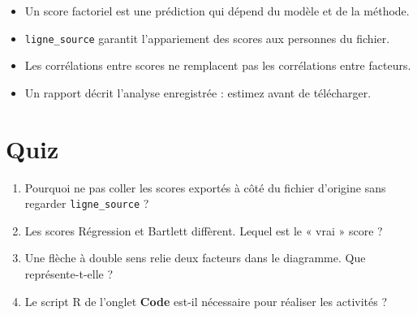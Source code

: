 \documentclass[
  french,
  11pt,
  a4paper,
  DIV=11,
  numbers=noendperiod]{scrreprt}
\providecommand{\tightlist}{%
  \setlength{\itemsep}{0pt}\setlength{\parskip}{0pt}}
\begin{document}
\begin{tcolorbox}[enhanced jigsaw, arc=.35mm, bottomrule=.15mm, bottomtitle=1mm, breakable, colback=white, colbacktitle=quarto-callout-important-color!10!white, colframe=quarto-callout-important-color-frame, coltitle=black, left=2mm, leftrule=.75mm, opacityback=0, opacitybacktitle=0.6, rightrule=.15mm, title={À retenir}, titlerule=0mm, toprule=.15mm, toptitle=1mm]

\begin{itemize}
\tightlist
\item
  Un score factoriel est une prédiction qui dépend du modèle et de la
  méthode.
\item
  \texttt{ligne\_source} garantit l'appariement des scores aux personnes
  du fichier.
\item
  Les corrélations entre scores ne remplacent pas les corrélations entre
  facteurs.
\item
  Un rapport décrit l'analyse enregistrée : estimez avant de
  télécharger.
\end{itemize}

\end{tcolorbox}

\section{Quiz}\label{quiz-11}

\begin{enumerate}
\def\labelenumi{\arabic{enumi}.}
\tightlist
\item
  Pourquoi ne pas coller les scores exportés à côté du fichier d'origine
  sans regarder \texttt{ligne\_source} ?
\item
  Les scores Régression et Bartlett diffèrent. Lequel est le « vrai »
  score ?
\item
  Une flèche à double sens relie deux facteurs dans le diagramme. Que
  représente-t-elle ?
\item
  Le script R de l'onglet \textbf{Code} est-il nécessaire pour réaliser
  les activités ?
\end{enumerate}
\end{document}
